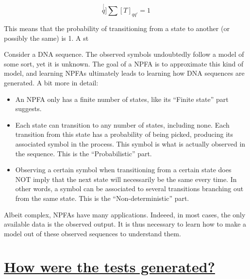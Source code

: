 \[
\stackrel[q]{}{\sum}[T]_{qq'}=1
\]


This means that the probability of transitioning from a state to another
(or possibly the same) is 1. A st

Consider a DNA sequence. The observed symbols undoubtedly follow a
model of some sort, yet it is unknown. The goal of a NPFA is to approximate
this kind of model, and learning NPFAs ultimately leads to learning
how DNA sequences are generated. A bit more in detail:
\begin{itemize}
\item An NPFA only has a finite number of states, like its ``Finite state''
part suggests.
\item Each state can transition to any number of states, including none.
Each transition from this state has a probability of being picked,
producing its associated symbol in the process. This symbol is what
is actually observed in the sequence. This is the ``Probabilistic''
part.
\item Observing a certain symbol when transitioning from a certain state
does NOT imply that the next state will necessarily be the same every
time. In other words, a symbol can be associated to several transitions
branching out from the same state. This is the ``Non-deterministic''
part.
\end{itemize}
Albeit complex, NPFAs have many applications. Indeeed, in most cases,
the only available data is the observed output. It is thus necessary
to learn how to make a model out of these observed sequences to understand
them.


\part*{{\large{}\uline{How were the tests generated?}}}

